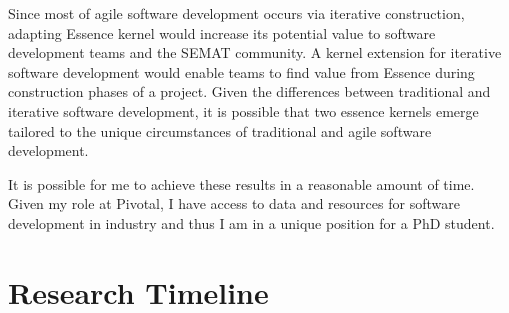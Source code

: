 \documentclass[preprint,12pt,3p]{elsarticle}
\begin{document}
Since most of agile software development occurs via iterative construction, adapting Essence kernel would increase its potential value to software development teams and the SEMAT community. A kernel extension for iterative software development would enable teams to find value from Essence during construction phases of a project. Given the differences between traditional and iterative software development, it is possible that two essence kernels emerge tailored to the unique circumstances of traditional and agile software development.

It is possible for me to achieve these results in a reasonable amount of time. Given my role at Pivotal, I have access to data and resources for software development in industry and thus I am in a unique position for a PhD student.  

\appendix
\section{Research Timeline}
\label{appendix}
\end{document}
